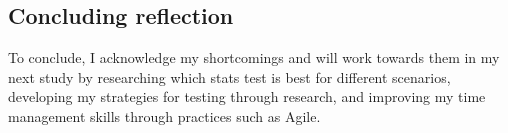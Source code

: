 \documentclass[conference]{IEEEtran}
\begin{document}
\subsection {Concluding reflection}
To conclude, I acknowledge my shortcomings and will work towards them in my next study by researching which stats test is best for different scenarios, developing my strategies for testing through research, and improving my time management skills through practices such as Agile.

\end{document}
